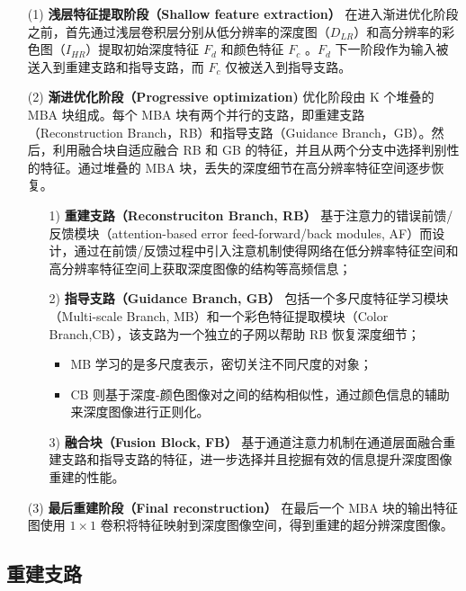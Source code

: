 \documentclass[14px]{article}
\begin{document}
\begin{enumerate}
	\item[(1)] \textbf{浅层特征提取阶段（Shallow feature extraction）}
	在进入渐进优化阶段之前，首先通过浅层卷积层分别从低分辨率的深度图（$D_{LR}$）和高分辨率的彩色图（$I_{HR}$）提取初始深度特征 $F_d$ 和颜色特征 $F_c$ 。$F_d$ 下一阶段作为输入被送入到重建支路和指导支路，而 $F_c$ 仅被送入到指导支路。
	\item[(2)] \textbf{渐进优化阶段（Progressive optimization)} 优化阶段由 K 个堆叠的 MBA 块组成。每个 MBA 块有两个并行的支路，即重建支路（Reconstruction Branch，RB）和指导支路（Guidance Branch，GB）。然后，利用融合块自适应融合 RB 和 GB 的特征，并且从两个分支中选择判别性的特征。通过堆叠的 MBA 块，丢失的深度细节在高分辨率特征空间逐步恢复。
	\begin{enumerate}
		\item[1)] \textbf{重建支路（Reconstruciton Branch, RB）} 基于注意力的错误前馈/反馈模块（attention-based error feed-forward/back modules, AF）而设计，通过在前馈/反馈过程中引入注意机制使得网络在低分辨率特征空间和高分辨率特征空间上获取深度图像的结构等高频信息；

		\item[2)] \textbf{指导支路（Guidance Branch, GB）} 包括一个多尺度特征学习模块（Multi-scale Branch, MB）和一个彩色特征提取模块（Color Branch,CB），该支路为一个独立的子网以帮助 RB 恢复深度细节；
		\begin{itemize}
			\item MB 学习的是多尺度表示，密切关注不同尺度的对象；
			\item CB 则基于深度-颜色图像对之间的结构相似性，通过颜色信息的辅助来深度图像进行正则化。
		\end{itemize}

	\item[3)] \textbf{融合块（Fusion Block, FB）} 基于通道注意力机制在通道层面融合重建支路和指导支路的特征，进一步选择并且挖掘有效的信息提升深度图像重建的性能。

 
	\end{enumerate}
	\item[(3)] \textbf{最后重建阶段（Final reconstruction）} 在最后一个 MBA 块的输出特征图使用 $1\times 1$ 卷积将特征映射到深度图像空间，得到重建的超分辨深度图像。
\end{enumerate}

\subsection{重建支路}
\end{document}
